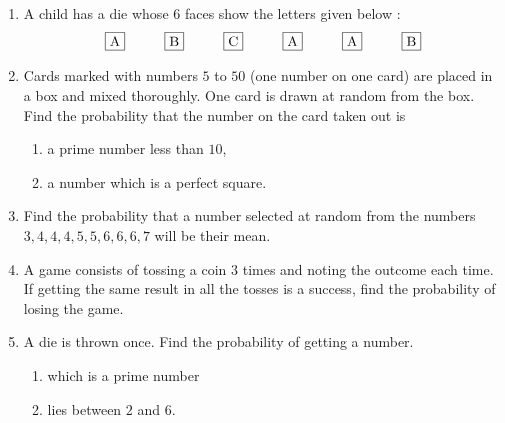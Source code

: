 \begin{enumerate}
\item A child has a die whose $6$ faces show the letters given below :
\begin{align*}
    { \framebox {A} \hspace{1cm}} {\framebox {B} \hspace{1cm}} {\framebox {C}\hspace{1cm}} {\framebox {A}\hspace{1cm}} {\framebox {A}\hspace{1cm}} {\framebox {B}}
\end{align*}

\item Cards marked with numbers $5$ to $50$ (one number on one card) are placed in a box and mixed thoroughly. One card is drawn at random from the box. Find the probability that the number on the card taken out is \begin{enumerate}
    \item a prime number less than $10$,  
    \item a number which is a perfect square.
\end{enumerate}

\item Find the probability that a number selected at random from the numbers $3, 4, 4, 4, 5, 5, 6, 6, 6, 7$ will be their mean.
	\item A game consists of tossing a coin $3$ times and noting the outcome each time. If getting the same result in all the tosses is a success, find the probability of losing the game.
	\item A die is thrown once. Find the probability of getting a number.
	\begin{enumerate}
	\item which is a prime number
	\item lies between $2$ and $6$.
	\end{enumerate}

\end{enumerate}
